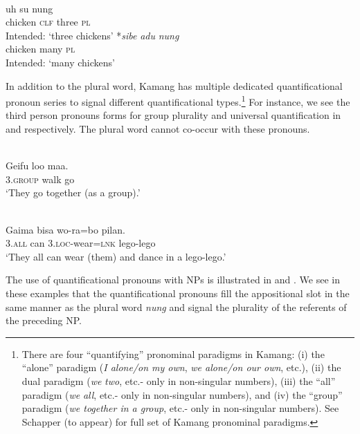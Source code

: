 \ea%
\label{ex:9:39}
 \\
\ea
{} uh su {nung}\\
   chicken \textsc{clf} three \textsc{pl} \\
\glt Intended: `three chickens'
\ex
\gll
*\textit{sibe} \textit{adu} \textit{nung}\\
    chicken many   \textsc{pl}\\
\glt  Intended: `many chickens'
 \z
 \z




In addition to the plural word, Kamang has multiple dedicated quantificational pronoun series to signal different quantificational types.\footnote{  There are four ``quantifying'' pronominal paradigms in Kamang: (i) the ``alone'' paradigm (\textit{I alone/on my own}, \textit{we alone/on our own}, etc.), (ii) the dual paradigm (\textit{we} \textit{two}, etc.- only in non-singular numbers), (iii) the ``all'' paradigm (\textit{we} \textit{all}, etc.- only in non-singular numbers), and (iv) the ``group'' paradigm (\textit{we together in a group}, etc.- only in non-singular numbers). See Schapper (to appear) for full set of Kamang pronominal paradigms.} For instance, we see the third person pronouns forms for group plurality and universal quantification in  and  respectively. The plural word cannot co-occur with these pronouns.


\ea%
 \\
\label{ex:9:40}
\gll  Geifu   loo maa.  \\
  3.\textsc{group} walk go   \\
\glt `They go together (as a group).'
\z






\ea%
\label{ex:9:41}
 \\
\gll Gaima bisa wo-ra=bo pilan. \\
  3.\textsc{all} can   3.\textsc{loc}-wear=\textsc{lnk} lego-lego  \\
\glt `They all can wear (them) and dance in a lego-lego.'
\z






The use of quantificational pronouns with NPs is illustrated in  and . We see in these examples that the quantificational pronouns fill the appositional slot in the same manner as the plural word \textit{nung} and signal the plurality of the referents of the preceding NP.


